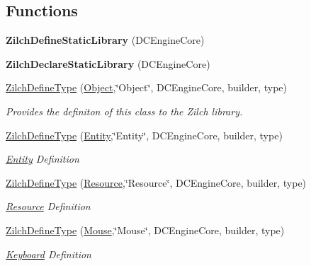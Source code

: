 \subsection*{Functions}
\begin{DoxyCompactItemize}
\item 
\hypertarget{namespaceDCEngine_aae767e7ae0d28f208d58833f8837ca01}{{\bfseries Zilch\-Define\-Static\-Library} (D\-C\-Engine\-Core)}\label{namespaceDCEngine_aae767e7ae0d28f208d58833f8837ca01}

\item 
\hypertarget{namespaceDCEngine_ae7b2aab7a615ba78bb46d60c0a1e9b33}{{\bfseries Zilch\-Declare\-Static\-Library} (D\-C\-Engine\-Core)}\label{namespaceDCEngine_ae7b2aab7a615ba78bb46d60c0a1e9b33}

\item 
\hyperlink{namespaceDCEngine_a329111a922e14ea87ebb459646b6e3dd}{Zilch\-Define\-Type} (\hyperlink{classDCEngine_1_1Object}{Object},\char`\"{}Object\char`\"{}, D\-C\-Engine\-Core, builder, type)
\begin{DoxyCompactList}\small\item\em Provides the definiton of this class to the Zilch library.  \end{DoxyCompactList}\item 
\hyperlink{namespaceDCEngine_a73824777eee63ffabcbff604d0223e7c}{Zilch\-Define\-Type} (\hyperlink{classDCEngine_1_1Entity}{Entity},\char`\"{}Entity\char`\"{}, D\-C\-Engine\-Core, builder, type)
\begin{DoxyCompactList}\small\item\em \hyperlink{classDCEngine_1_1Entity}{Entity} Definition  \end{DoxyCompactList}\item 
\hyperlink{namespaceDCEngine_a7510ef1bad1ec634e48f03ecf6a5214d}{Zilch\-Define\-Type} (\hyperlink{classDCEngine_1_1Resource}{Resource},\char`\"{}Resource\char`\"{}, D\-C\-Engine\-Core, builder, type)
\begin{DoxyCompactList}\small\item\em \hyperlink{classDCEngine_1_1Resource}{Resource} Definition  \end{DoxyCompactList}\item 
\hyperlink{namespaceDCEngine_af3d5499e43b5081cd78cb2c4749d0f10}{Zilch\-Define\-Type} (\hyperlink{classDCEngine_1_1Mouse}{Mouse},\char`\"{}Mouse\char`\"{}, D\-C\-Engine\-Core, builder, type)
\begin{DoxyCompactList}\small\item\em \hyperlink{classDCEngine_1_1Keyboard}{Keyboard} Definition  \end{DoxyCompactList}\item 

\end{DoxyCompactItemize}
